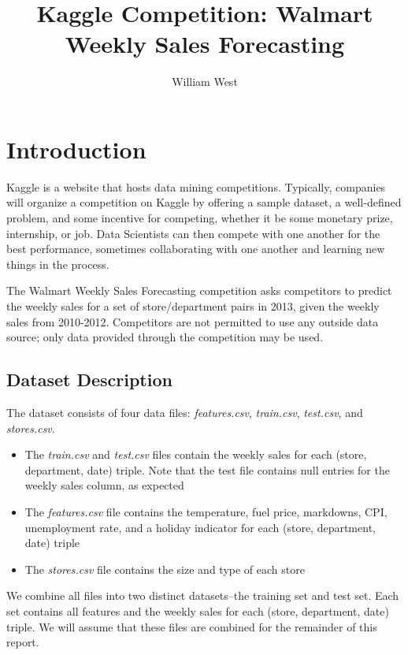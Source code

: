 \documentclass{article}
\begin{document}
\title{Kaggle Competition: Walmart Weekly Sales Forecasting}
\author{William West}

\maketitle

\section{Introduction}

Kaggle is a website that hosts data mining competitions. Typically, companies will organize a competition on Kaggle by offering a sample dataset, a well-defined problem, and some incentive for competing, whether it be some monetary prize, internship, or job. Data Scientists can then compete with one another for the best performance, sometimes collaborating with one another and learning new things in the process.

The Walmart Weekly Sales Forecasting competition asks competitors to predict the weekly sales for a set of store/department pairs in 2013, given the weekly sales from 2010-2012. Competitors are not permitted to use any outside data source; only data provided through the competition may be used.

\subsection{Dataset Description}

The dataset consists of four data files: \emph{features.csv}, \emph{train.csv}, \emph{test.csv}, and \emph{stores.csv}.

\begin{itemize}
\item The \emph{train.csv} and \emph{test.csv} files contain the weekly sales for each (store, department, date) triple. Note that the test file contains null entries for the weekly sales column, as expected
\item The \emph{features.csv} file contains the temperature, fuel price, markdowns, CPI, unemployment rate, and a holiday indicator for each (store, department, date) triple
\item The \emph{stores.csv} file contains the size and type of each store
\end{itemize}

We combine all files into two distinct datasets--the training set and test set. Each set contains all features and the weekly sales for each (store, department, date) triple. We will assume that these files are combined for the remainder of this report.
\end{document}
